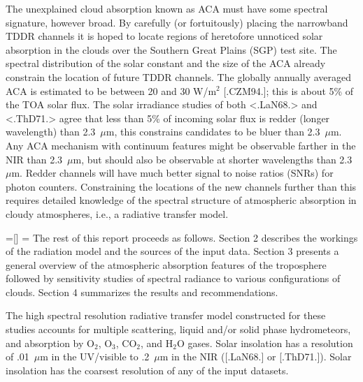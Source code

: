 

The unexplained cloud absorption known as ACA must have some spectral
signature, however broad. 
By carefully (or fortuitously) placing the narrowband TDDR channels it
is hoped to locate regions of heretofore unnoticed solar absorption in
the clouds over the Southern Great Plains (SGP) test site. 
The spectral distribution of the solar constant and
the size of the ACA already constrain the location of future TDDR
channels. 
The globally annually averaged ACA is estimated to be between 20 and
30 W/m$^2$ [.CZM94.]; this is about 5\% of the TOA solar flux.  
The solar irradiance studies of both 
<.LaN68.> and <.ThD71.> agree that less than 5\% of incoming solar
flux is redder (longer wavelength) than 2.3~$\mu$m, this constrains 
candidates to be bluer than 2.3~$\mu$m.  
Any ACA mechanism with continuum features might be observable farther
in the NIR than 2.3~$\mu$m, but should also be observable at shorter
wavelengths than 2.3~$\mu$m. 
Redder channels will have much better signal to noise ratios
(SNRs) for photon counters. 
Constraining the locations of the new channels further than this
requires detailed knowledge of the spectral structure of
atmospheric absorption in cloudy atmospheres, i.e., a radiative
transfer model.

\headline={\tenrm \hfil [\oldstyle\folio\tenrm]}
\footline={\hfil}
%
The rest of this report proceeds as follows.
Section 2 describes the workings of the radiation model and the
sources of the input data.
Section 3 presents a general overview of the atmospheric absorption
features of the troposphere followed by sensitivity
studies of spectral radiance to various configurations of clouds.
Section 4 summarizes the results and recommendations.


The high spectral resolution radiative transfer model constructed
for these studies
accounts for multiple scattering, liquid and/or solid phase
hydrometeors, and absorption by O$_2$, O$_3$, CO$_2$, and H$_2$O
gases.  
Solar insolation has a resolution of .01~$\mu$m in the UV/visible to 
.2~$\mu$m in the NIR ([.LaN68.] or [.ThD71.]). Solar insolation has
the coarsest resolution of any of the input datasets.

